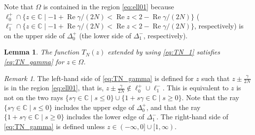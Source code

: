 \documentclass[a4paper,dvipdfmx]{amsart}
\theoremstyle{plain}
\newtheorem{lem}[thm]{Lemma}
\theoremstyle{definition}
\theoremstyle{remark}
\newtheorem{rem}[thm]{Remark}
\newcommand{\C}{\mathbb{C}}
\renewcommand{\Re}{\operatorname{Re}}
\numberwithin{equation}{section}
\begin{document}
Note that $\Omega$ is contained in the region \eqref{eq:ell01} because $\ell_{0}^{+}\cap\{z\in\C\mid-1+\Re\gamma/(2N)<\Re{z}<2-\Re\gamma/(2N)\}$ ($\ell_{1}^{-}\cap\{z\in\C\mid-1+\Re\gamma/(2N)<\Re{z}<2-\Re\gamma/(2N)\}$, respectively) is on the upper side of $\Delta_{0}^{+}$ (the lower side of $\Delta_{1}^{-}$, respectively).
\begin{lem}\label{lem:TN_gamma_Omega}
The function $T_{N}(z)$ extended by using \eqref{eq:TN_1} satisfies \eqref{eq:TN_gamma} for $z\in\Omega$.
\end{lem}
\begin{rem}\label{rem:Omega}
The left-hand side of \eqref{eq:TN_gamma} is defined for $z$ such that $z\pm\frac{\gamma}{2N}$ is in the region \eqref{eq:ell01}, that is, $z\pm\frac{\gamma}{2N}\not\in\ell_0^{+}\cup\ell_1^{-}$.
This is equivalent to $z$ is not on the two rays $\{s\gamma\in\C\mid s\le0\}\cup\{1+s\gamma\in\C\mid s\ge0\}$.
Note that the ray $\{s\gamma\in\C\mid s\le0\}$ includes the upper edge of $\Delta_{0}^{+}$, and that the ray $\{1+s\gamma\in\C\mid s\ge0\}$ includes the lower edge of $\Delta_{1}^{-}$.
The right-hand side of \eqref{eq:TN_gamma} is defined unless $z\in(-\infty,0]\cup[1,\infty)$.
\end{rem}
\end{document}
